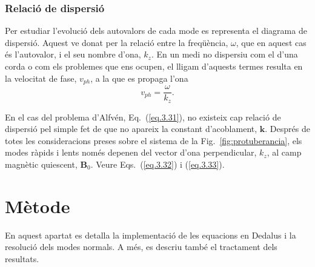 \documentclass[12pt,a4paper]{article}
\numberwithin{equation}{section}
\begin{document}
\subsubsection{Relació de dispersió}
Per estudiar l'evolució dels autovalors de cada mode es representa el diagrama de dispersió.
Aquest ve donat per la relació entre la freqüència, $\omega$, que en aquest cas és l'autovalor, i el seu nombre d'ona, $k_z$.
En un medi no dispersiu com el d'una corda o com els problemes que ens ocupen,
el lligam d'aquests termes resulta en la velocitat de fase, $v_{ph}$, a la que es propaga l'ona
\begin{equation}
    {v}_{ph} = \frac{\omega}{k_z}. \tag{3.34} \label{eq.3.34}
\end{equation}
%
%

En el cas del problema d'Alfvén, Eq.~(\ref{eq.3.31}), no existeix cap relació de dispersió pel simple fet de que no apareix la constant d'acoblament, $\bm{k}$.
Després de totes les consideracions preses sobre el sistema de la Fig.~\ref{fig:protuberancia},
els modes ràpids i lents només depenen del vector d'ona perpendicular, $k_z$, al camp magnètic quiescent, $\bm{B}_0$. Veure Eqs.~(\ref{eq.3.32}) i (\ref{eq.3.33}).

%
% 
% 
% 
%


\clearpage


\section{Mètode} \label{sec:mètode}
En aquest apartat es detalla la implementació de les equacions en Dedalus i la resolució dels modes normals.
A més, es descriu també el tractament dels resultats.
\end{document}
